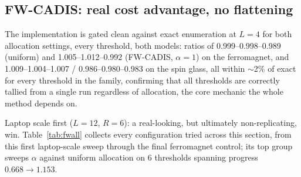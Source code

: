 \documentclass[11pt]{article}
\begin{document}
	\subsection{FW-CADIS: real cost advantage, no flattening}
	\label{sec:fwcadis}
	The implementation is gated clean against exact enumeration at $L=4$ for both allocation
	settings, every threshold, both models: ratios of 0.999--0.998--0.989 (uniform) and
	1.005--1.012--0.992 (FW-CADIS, $\alpha=1$) on the ferromagnet, and 1.009--1.004--1.007 /
	0.986--0.980--0.983 on the spin glass, all within $\sim$2\% of exact for every threshold in
	the family, confirming that all thresholds are correctly tallied from a single run
	regardless of allocation, the core mechanic the whole method depends on.
	
	Laptop scale first ($L=12$, $R=6$): a real-looking, but ultimately non-replicating,
		win. Table~\ref{tab:fwall} collects every configuration tried across this section, from
	this first laptop-scale sweep through the final ferromagnet control; its top group sweeps
	$\alpha$ against uniform allocation on 6 thresholds spanning progress $0.668\to1.153$.
\end{document}
